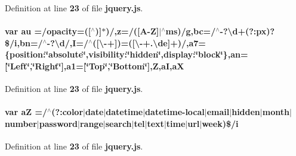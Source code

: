 Definition at line {\bf 23} of file {\bf jquery.\+js}.

\paragraph[{au}]{\setlength{\rightskip}{0pt plus 5cm}var au =/opacity=([$^\wedge$)]$\ast$)/,z=/([A-\/{\bf Z}]$\vert$$^\wedge$ms)/g,bc=/$^\wedge$-\/?\textbackslash{}d+(?\+:px)?\$/{\bf i},bn=/$^\wedge$-\/?\textbackslash{}d/,I=/$^\wedge$([\textbackslash{}-\/+])=([\textbackslash{}-\/+.\textbackslash{}de]+)/,a7=\{position\+:\char`\"{}absolute\char`\"{},visibility\+:\char`\"{}hidden\char`\"{},display\+:\char`\"{}block\char`\"{}\},an=[\char`\"{}Left\char`\"{},\char`\"{}Right\char`\"{}],a1=[\char`\"{}Top\char`\"{},\char`\"{}Bottom\char`\"{}],Z,aI,aX}\label{soapysdr_2build_2docs_2html_2jquery_8js_a4fd8ddfab07c8d7c7cae0ab0e052cad3}


Definition at line {\bf 23} of file {\bf jquery.\+js}.

\paragraph[{aZ}]{\setlength{\rightskip}{0pt plus 5cm}var aZ =/$^\wedge$(?\+:color$\vert$date$\vert$datetime$\vert$datetime-\/local$\vert$email$\vert$hidden$\vert$month$\vert$number$\vert$password$\vert${\bf range}$\vert$search$\vert$tel$\vert$text$\vert$time$\vert$url$\vert$week)\$/{\bf i}}\label{soapysdr_2build_2docs_2html_2jquery_8js_ac87125cdee1a5e57da4ef619af49bc7d}


Definition at line {\bf 23} of file {\bf jquery.\+js}.

